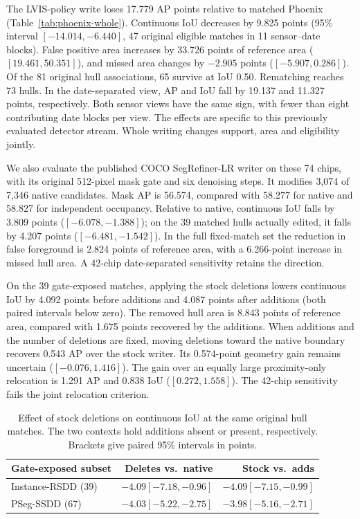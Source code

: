 \documentclass[journal]{IEEEtran}
\begin{document}
The LVIS-policy write loses 17.779 AP points relative to matched Phoenix (Table~\ref{tab:phoenix-whole}). Continuous IoU decreases by 9.825 points (95\% interval \([-14.014,-6.440]\), 47 original eligible matches in 11 sensor--date blocks). False positive area increases by 33.726 points of reference area (\([19.461,50.351]\)), and missed area changes by \(-2.905\) points (\([-5.907,0.286]\)). Of the 81 original hull associations, 65 survive at IoU 0.50. Rematching reaches 73 hulls. In the date-separated view, AP and IoU fall by 19.137 and 11.327 points, respectively. Both sensor views have the same sign, with fewer than eight contributing date blocks per view. The effects are specific to this previously evaluated detector stream. Whole writing changes support, area and eligibility jointly.

We also evaluate the published COCO SegRefiner-LR writer on these 74 chips, with its original 512-pixel mask gate and six denoising steps. It modifies 3,074 of 7,346 native candidates. Mask AP is 56.574, compared with 58.277 for native and 58.827 for independent occupancy. Relative to native, continuous IoU falls by 3.809 points (\([-6.078,-1.388]\)); on the 39 matched hulls actually edited, it falls by 4.207 points (\([-6.481,-1.542]\)). In the full fixed-match set the reduction in false foreground is 2.824 points of reference area, with a 6.266-point increase in missed hull area. A 42-chip date-separated sensitivity retains the direction.

On the 39 gate-exposed matches, applying the stock deletions lowers continuous IoU by 4.092 points before additions and 4.087 points after additions (both paired intervals below zero). The removed hull area is 8.843 points of reference area, compared with 1.675 points recovered by the additions. When additions and the number of deletions are fixed, moving deletions toward the native boundary recovers 0.543 AP over the stock writer. Its 0.574-point geometry gain remains uncertain (\([-0.076,1.416]\)). The gain over an equally large proximity-only relocation is 1.291 AP and 0.838 IoU (\([0.272,1.558]\)). The 42-chip sensitivity fails the joint relocation criterion.


\begin{table}[t]
\centering
\caption{Effect of stock deletions on continuous IoU at the same original hull matches. The two contexts hold additions absent or present, respectively. Brackets give paired 95\% intervals in points.}
\label{tab:stock-deletions}
\footnotesize
\setlength{\tabcolsep}{3pt}
\begin{tabular}{@{}lrr@{}}
\toprule
Gate-exposed subset & Deletes vs.\ native & Stock vs.\ adds \\
\midrule
Instance-RSDD (39) & \(-4.09[-7.18,-0.96]\) & \(-4.09[-7.15,-0.99]\) \\
PSeg-SSDD (67) & \(-4.03[-5.22,-2.75]\) & \(-3.98[-5.16,-2.71]\) \\
\bottomrule
\end{tabular}
\end{table}
\end{document}
